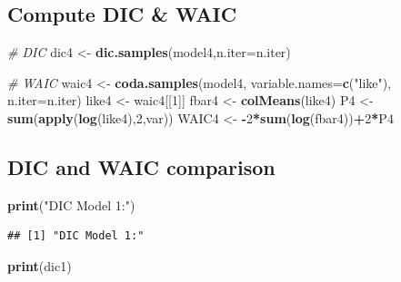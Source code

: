 \documentclass[
]{article}
\newenvironment{Shaded}{\begin{snugshade}}{\end{snugshade}}
\newcommand{\AttributeTok}[1]{\textcolor[rgb]{0.13,0.29,0.53}{#1}}
\newcommand{\CommentTok}[1]{\textcolor[rgb]{0.56,0.35,0.01}{\textit{#1}}}
\newcommand{\DecValTok}[1]{\textcolor[rgb]{0.00,0.00,0.81}{#1}}
\newcommand{\FunctionTok}[1]{\textcolor[rgb]{0.13,0.29,0.53}{\textbf{#1}}}
\newcommand{\NormalTok}[1]{#1}
\newcommand{\OtherTok}[1]{\textcolor[rgb]{0.56,0.35,0.01}{#1}}
\newcommand{\SpecialCharTok}[1]{\textcolor[rgb]{0.81,0.36,0.00}{\textbf{#1}}}
\newcommand{\StringTok}[1]{\textcolor[rgb]{0.31,0.60,0.02}{#1}}
\begin{document}
\subsection{Compute DIC \& WAIC}\label{compute-dic-waic-3}

\begin{Shaded}
\begin{Highlighting}[]
\CommentTok{\# DIC}
\NormalTok{dic4 }\OtherTok{\textless{}{-}} \FunctionTok{dic.samples}\NormalTok{(model4,}\AttributeTok{n.iter=}\NormalTok{n.iter)}

\CommentTok{\# WAIC}
\NormalTok{waic4 }\OtherTok{\textless{}{-}} \FunctionTok{coda.samples}\NormalTok{(model4, }\AttributeTok{variable.names=}\FunctionTok{c}\NormalTok{(}\StringTok{"like"}\NormalTok{), }\AttributeTok{n.iter=}\NormalTok{n.iter)}
\NormalTok{like4 }\OtherTok{\textless{}{-}}\NormalTok{ waic4[[}\DecValTok{1}\NormalTok{]]}
\NormalTok{fbar4 }\OtherTok{\textless{}{-}} \FunctionTok{colMeans}\NormalTok{(like4)}
\NormalTok{P4 }\OtherTok{\textless{}{-}} \FunctionTok{sum}\NormalTok{(}\FunctionTok{apply}\NormalTok{(}\FunctionTok{log}\NormalTok{(like4),}\DecValTok{2}\NormalTok{,var))}
\NormalTok{WAIC4 }\OtherTok{\textless{}{-}} \SpecialCharTok{{-}}\DecValTok{2}\SpecialCharTok{*}\FunctionTok{sum}\NormalTok{(}\FunctionTok{log}\NormalTok{(fbar4))}\SpecialCharTok{+}\DecValTok{2}\SpecialCharTok{*}\NormalTok{P4}
\end{Highlighting}
\end{Shaded}

\subsection{DIC and WAIC comparison}\label{dic-and-waic-comparison}

\begin{Shaded}
\begin{Highlighting}[]
\FunctionTok{print}\NormalTok{(}\StringTok{"DIC Model 1:"}\NormalTok{)}
\end{Highlighting}
\end{Shaded}

\begin{verbatim}
## [1] "DIC Model 1:"
\end{verbatim}

\begin{Shaded}
\begin{Highlighting}[]
\FunctionTok{print}\NormalTok{(dic1)}
\end{Highlighting}
\end{Shaded}
\end{document}
